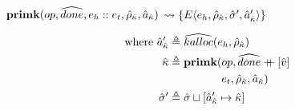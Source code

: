 \documentclass[12pt,draft]{article}
\newcommand\mdoubleplus{\ensuremath{\mathbin{+\mkern-9mu+}}}
\newcommand{\E}[4]{E\langle #1 , #2 , #3 , #4 \rangle}
\begin{document}
\begin{multicols*}{2}
\begin{align*}
\end{align*}
\begin{center}
  $\textbf{primk}(op, \widehat{done} , e_h::e_t , \hat{\rho}_{\hat{\kappa}} , \hat{a}_{\hat{\kappa}})$
  $\leadsto \{\E{e_h}{\aenv_{\akont}}{\astore'}{\akaddr'}\}$
\end{center}
\vspace{-7mm}
\begin{align*}
  \text{where }
  \akaddr' &\triangleq \akalloc{e_h , \aenv_{\akont}} \\
  \akont &\triangleq \textbf{primk}(op, \adone \mdoubleplus [\aval] \\
            &\;\;\;\;\;\;\;\;\;\;\;\;\;\;\;\;\; e_t , \aenv_{\akont} , \akaddr) \\
  \astore' &\triangleq \astore \sqcup [\akaddr' \mapsto \akont]
\end{align*}
\end{multicols*}


\newpage
\end{document}
